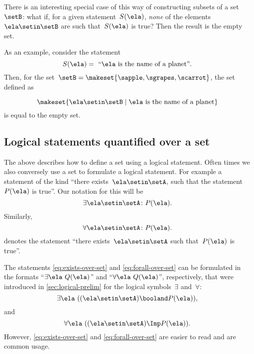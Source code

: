 There is an interesting special case of this way of constructing subsets of a set~$\setB$:
what if, for a given statement~$S(\ela)$, \emph{none} of the elements~$\ela \setin\setB$ are such that~$S(\ela)$ is true?
Then the result is the empty set.

As an example, consider the statement
%
\begin{equation}
    S(\ela) =\text{ ``} \ela \text{ is the name of a planet''}.
\end{equation}
%
Then, for the set~$\setB = \makeset{ \sapple, \sgrapes, \scarrot }$, the set defined as

\begin{equation}
    \makeset{ \ela \setin\setB \mid \ela \text{ is the name of a planet} }
\end{equation}
is equal to the empty set.

\subsection{Logical statements quantified over a set}

The above describes how to define a set using a logical statement.
Often times we also conversely use a set to formulate a logical statement.
For example a statement of the kind ``there exists~$\ela \setin \setA$, such that the statement~$P(\ela)$ is true''.
Our notation for this will be
%
\begin{equation}
    \label{eq:exists-over-set}
    \exists \ela \setin \setA \colon P(\ela).
\end{equation}
%
Similarly,
\begin{equation}
    \label{eq:forall-over-set}
    \forall \ela \setin \setA \colon P(\ela).
\end{equation}
denotes the statement ``there exists~$\ela \setin \setA$ such that~$P(\ela)$ is true''.

\begin{remark}
    The statements \cref{eq:exists-over-set} and \cref{eq:forall-over-set} can be formulated in the formats ``$\exists \ela \ Q(\ela)$'' and ``$\forall \ela \ Q(\ela)$'', respectively, that were introduced in \cref{sec:logical-prelim} for the logical symbols~$\exists$ and~$\forall$:
    \begin{equation}
        \exists \ela \  ((\ela \setin \setA) \booland P(\ela)),
    \end{equation}
    and
    \begin{equation}
        \forall \ela\  ((\ela\setin \setA) \Imp P(\ela)).
    \end{equation}
    However, \cref{eq:exists-over-set} and \cref{eq:forall-over-set} are easier to read and are common usage.
\end{remark}

